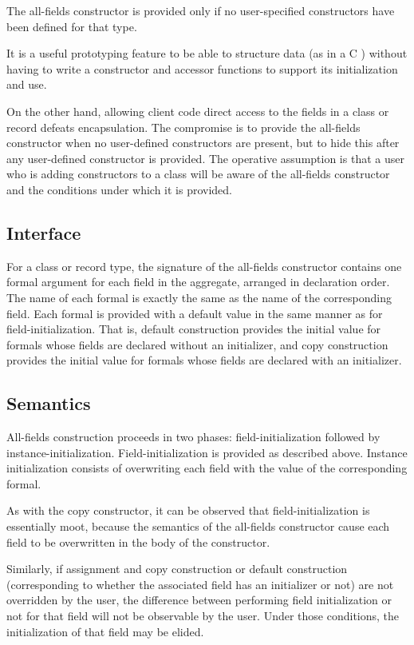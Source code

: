 The all-fields constructor is provided only if no user-specified constructors
have been defined for that type.  

\begin{rationale}

It is a useful prototyping feature to be able to structure data (as in a C
) without having to write a constructor and accessor functions to
support its initialization and use.

On the other hand, allowing client code direct access to the fields in a class
or record defeats encapsulation.  The compromise is to provide the all-fields
constructor when no user-defined constructors are present, but to hide this
after any user-defined constructor is provided.  The operative assumption is
that a user who is adding constructors to a class will be aware of the
all-fields constructor and the conditions under which it is provided.

\end{rationale}

\subsection{Interface}

For a class or record type, the signature of the all-fields constructor contains
one formal argument for each field in the aggregate, arranged in declaration
order.  The name of each formal is exactly the same as the name of the
corresponding field.  Each formal is provided with a default value in the same
manner as for field-initialization.  That is, default construction provides the
initial value for formals whose fields are declared without an initializer, and
copy construction provides the initial value for formals whose fields are
declared with an initializer. 

\subsection{Semantics}

All-fields construction proceeds in two phases: field-initialization followed by
instance-initialization.  Field-initialization is provided as described above.
Instance initialization consists of overwriting each field with the value of the
corresponding formal.

\begin{note}

As with the copy constructor, it can be observed that field-initialization is
essentially moot, because the semantics of the all-fields constructor cause each
field to be overwritten in the body of the constructor.

Similarly, if assignment and copy construction or default construction
(corresponding to whether the associated field has an initializer or not) are
not overridden by the user, the difference between performing field
initialization or not for that field will not be observable by the user.  Under
those conditions, the initialization of that field may be elided.

\end{note}

